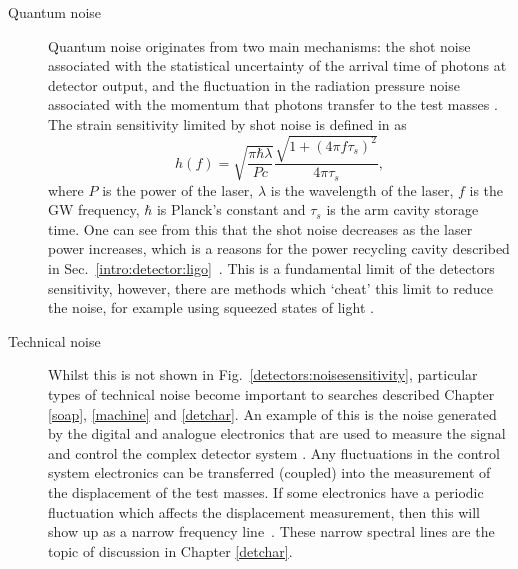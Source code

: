 \begin{description}
\item[Quantum noise] Quantum noise originates from two main mechanisms: the shot noise associated with the
statistical uncertainty of the arrival time of photons at detector output, and the fluctuation in the radiation pressure noise associated with the momentum that photons transfer to the test masses \citep{aasi2013EnhancedSensitivity}.
The strain sensitivity limited by shot noise is defined in \citep{abbott2009LIGOLaser} as
\begin{equation}
	h(f) = \sqrt{\frac{\pi \hbar \lambda}{P c}} \frac{\sqrt{1 + (4 \pi f \tau_s)^2}}{4 \pi \tau_s},
\end{equation}
where $P$ is the power of the laser, $\lambda$ is the wavelength of the laser, $f$ is the \gls{GW} frequency, $\hbar$ is Planck's constant and $\tau_s$ is the arm cavity storage time. 
One can see from this that the shot noise decreases as the laser power
increases, which is a reasons for the power recycling cavity described in
Sec.~\ref{intro:detector:ligo}~. 
This is a fundamental limit of the detectors sensitivity, however, there are methods which `cheat' this limit to reduce
the noise, for example using squeezed states of light \citep{aasi2013EnhancedSensitivity}. 

\item[Technical noise] Whilst this is not shown
in Fig.~\ref{detectors:noisesensitivity}, particular types of technical noise
become important to searches
described Chapter \ref{soap}, \ref{machine} and \ref{detchar}. An example of this is the noise generated by the digital and analogue electronics that are used to measure the signal and control the complex
detector system \citep{martynov2016SensitivityAdvanced}. Any fluctuations in the control system electronics can be transferred (coupled) into the measurement of the displacement of the test masses. 
If some electronics have a periodic fluctuation which affects the displacement
measurement, then this will show up as a narrow frequency line~. These narrow spectral lines are the topic of discussion in Chapter \ref{detchar}.

\end{description}

